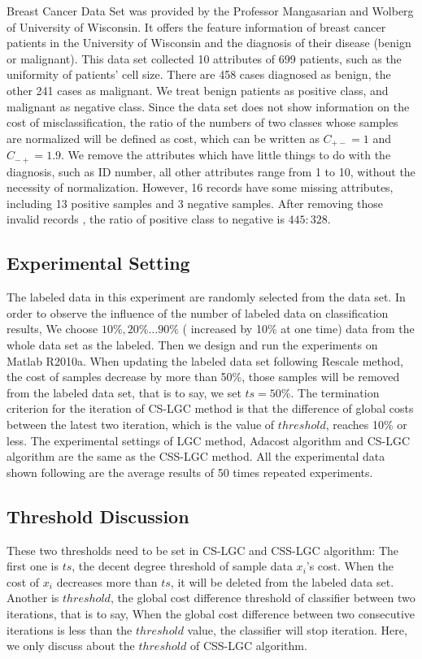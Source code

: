 \documentclass{svjour3}                     %
\begin{document}
Breast Cancer Data Set\cite{Mangasarian90} was provided by the Professor Mangasarian and Wolberg of University of Wisconsin. It offers the feature information of breast cancer patients in the University of Wisconsin and the diagnosis of their disease (benign or malignant). This data set collected 10 attributes of 699 patients, such as the uniformity of patients' cell size. There are 458 cases diagnosed as benign, the other 241 cases as malignant. We treat benign patients as positive class, and malignant as negative class. Since the data set does not show information on the cost of misclassification, the ratio of the numbers of two classes whose samples are normalized will be defined as cost, which can be written as ${C_{ +  - }} = 1$ and ${C_{ -  + }} = 1.9$. We remove the attributes which have little things to do with the diagnosis, such as ID number, all other attributes range from 1 to 10, without the necessity of normalization. However, 16 records have some missing attributes, including 13 positive samples and 3 negative samples. After removing those invalid records , the ratio of positive class to negative is $445:328$.

\subsection{Experimental Setting}
The labeled data in this experiment are randomly selected from the data set. In order to observe the influence of the number of labeled data on classification results, We choose $10\%, 20\% \ldots 90\%$ ( increased by 10\% at one time) data from the whole data set as the labeled. Then we design and run the experiments on Matlab R2010a. When updating the labeled data set following Rescale method, the cost of samples decrease by more than 50\%, those samples will be removed from the labeled data set, that is to say, we set $ts = 50\% $. The termination criterion for the iteration of CS-LGC method is that the difference of global costs between the latest two iteration, which is the value of $threshold$, reaches 10\% or less. The experimental settings of LGC method, Adacost algorithm and CS-LGC algorithm are the same as the CSS-LGC method. All the experimental data shown following are the average results of 50 times repeated experiments.

\subsection{Threshold Discussion}
These two thresholds need to be set in CS-LGC and CSS-LGC algorithm: The first one is $ts$, the decent degree threshold of sample data $x_i$'s cost. When the cost of $x_i$ decreases more than $ts$, it will be deleted from the labeled data set. Another is $threshold$, the global cost difference threshold of classifier between two iterations, that is to say, When the global cost difference between two consecutive iterations is less than the $threshold$ value, the classifier will stop iteration. Here, we only discuss about the $threshold$ of CSS-LGC algorithm.
\end{document}

